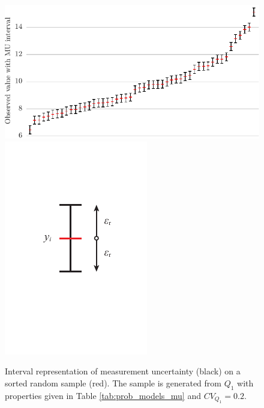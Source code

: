\begin{figure}[htbp!] 
	\centering    
	\includegraphics[]{obs_with_interval.pdf}
	\includegraphics[]{MU_interval.pdf}
	\caption{Interval representation of measurement uncertainty (black) on a sorted random sample (red). The sample is generated from $Q_1$ with properties given in Table \ref{tab:prob_models_mu} and $CV_{Q_1} = 0.2$.}
	\label{fig:obs_with_interval}
\end{figure}

